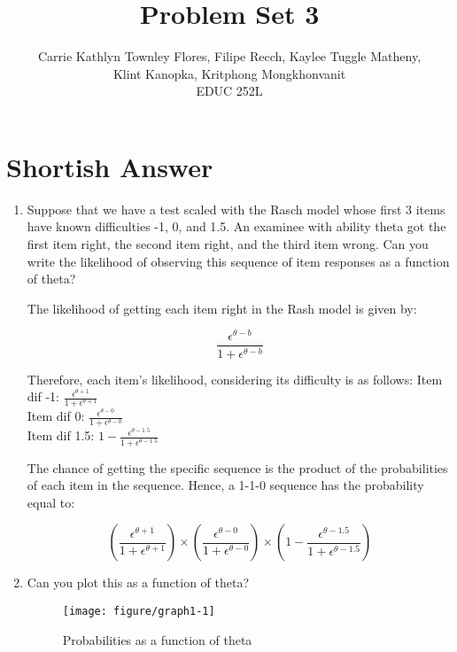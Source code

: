 \documentclass{article}\usepackage[]{graphicx}\usepackage[]{color}
\title{Problem Set 3}
\author{Carrie Kathlyn Townley Flores, Filipe Recch, Kaylee Tuggle Matheny, \\ Klint Kanopka, Kritphong Mongkhonvanit \\ EDUC 252L}
\makeatletter
\def\maxwidth{ %
  \ifdim\Gin@nat@width>\linewidth
    \linewidth
  \else
    \Gin@nat@width
  \fi
}
\newenvironment{knitrout}{}{} %
\makeatother
\begin{document}
\maketitle

\section*{Shortish Answer}
\begin{enumerate}

\item Suppose that we have a test scaled with the Rasch model whose first 3 items have known difficulties -1, 0, and 1.5. An examinee with ability theta got the first item right, the second item right, and the third item wrong. Can you write the likelihood of observing this sequence of item responses as a function of theta?

The likelihood of getting each item right in the Rash model is given by:

$$ \frac{\epsilon^{\theta - b}}{1+\epsilon^{\theta - b}} $$ 

Therefore, each item's likelihood, considering its difficulty is as follows:
Item dif -1: $ \frac{\epsilon^{\theta + 1}}{1+\epsilon^{\theta + 1}} $ \\
Item dif 0: $ \frac{\epsilon^{\theta - 0}}{1+\epsilon^{\theta - 0}} $ \\
Item dif 1.5: $ 1 - \frac{\epsilon^{\theta - 1.5}}{1+\epsilon^{\theta - 1.5}} $ 

The chance of getting the specific sequence is the product of the probabilities of each item in the sequence. Hence, a 1-1-0 sequence has the probability equal to:

$$ \left(\frac{\epsilon^{\theta + 1}}{1+\epsilon^{\theta + 1}}\right) \times \left(\frac{\epsilon^{\theta - 0}}{1+\epsilon^{\theta - 0}} \right) \times \left(1 - \frac{\epsilon^{\theta - 1.5}}{1+\epsilon^{\theta - 1.5}} \right) $$

\item Can you plot this as a function of theta?

\begin{knitrout}
\color{fgcolor}\begin{figure}[H]

{\centering \texttt{[image: figure/graph1-1]} 

}

\caption[Probabilities as a function of theta]{Probabilities as a function of theta}\label{fig:graph1}
\end{figure}



\end{knitrout}
\end{enumerate}
\end{document}
